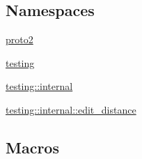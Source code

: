\subsection*{Namespaces}
\begin{DoxyCompactItemize}
\item 
 \hyperlink{namespaceproto2}{proto2}
\item 
 \hyperlink{namespacetesting}{testing}
\item 
 \hyperlink{namespacetesting_1_1internal}{testing\+::internal}
\item 
 \hyperlink{namespacetesting_1_1internal_1_1edit__distance}{testing\+::internal\+::edit\+\_\+distance}
\end{DoxyCompactItemize}
\subsection*{Macros}

